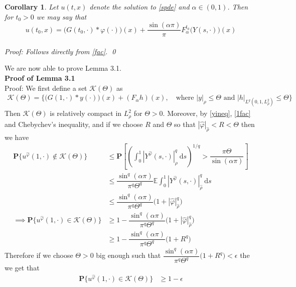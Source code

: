 \documentclass{article}
\newtheorem{corollary}{Corollary}[section]
\numberwithin{equation}{section}
\newcommand{\E}{\mathbb{E}}
\newcommand{\ud}{\ensuremath{\mathrm{d}}}
\begin{document}
\begin{corollary} Let $u(t,x)$ denote the solution to \eqref{spde} and $\alpha \in (0,1)$. Then for $t_0>0$ we may say that \begin{equation} u(t_0,x)=\big( G(t_0,\cdot)*\varphi(\cdot) \big)(x)+\dfrac{\sin(\alpha \pi)}{\pi}F_\alpha^{t_0}\big(Y(s,\cdot)\big)(x) \label{1fac}\end{equation} \\
\textit{Proof:} Follows directly from \eqref{fac}. \qed
\end{corollary}

We are now able to prove Lemma 3.1. \\

\noindent \textbf{Proof of Lemma 3.1} \\

Proof: We first define a set $\mathscr K (\Theta)$ as 
\begin{align*}
\mathscr K (\Theta) = \{ \big(G(1,\cdot)*y(\cdot)\big)(x)+(F_\alpha h)(x), \quad \text{where $|y|_{\rho} \le \Theta$  and  $|h|_{L^q(0,1,L^2_{\hat \rho})} \le \Theta $} \}
\end{align*}
Then $\mathscr K (\Theta)$ is relatively compact in $L^2_{ \rho}$ for $\Theta >0$. Moreover, by \eqref{yineq}, \eqref{1fac} and Chebychev's inequality, and if we choose $R$ and $\Theta$ so that $| \hat{\varphi}|_{\hat\rho} < R < \Theta$  then we have 
\begin{align*}
\textbf{P}\{ u^{\hat{\varphi}}(1,\cdot) \not \in \mathscr K(\Theta) \} & \le \textbf{P}\left[ \left(\int_{0}^{1} |Y^{\hat{\varphi}}(s,\cdot)|_{\rho}^q \: \ud s\right)^{1/q} > \dfrac{\pi \Theta}{\sin(\alpha \pi )} \right]
\\&\le \dfrac{\sin^q(\alpha \pi)}{\pi^q \Theta^q}\E \int_{0}^{1} |Y^{\hat{\varphi}}(s,\cdot)|_{\hat \rho}^q \: \ud s
\\& \le \dfrac{\sin^q(\alpha \pi)}{\pi^q \Theta^q}\bigg( 1+ |{\hat{\varphi}}|_{\hat\rho }^q \bigg)
\\ \implies \textbf{P}\{ u^{\hat{\varphi}}(1,\cdot) \in \mathscr K(\Theta) \} & \ge 1- \dfrac{\sin^q(\alpha \pi)}{\pi^q \Theta^q}\bigg( 1+ |{\hat{\varphi}}|_{\hat\rho }^q \bigg) 
\\ &\ge 1- \dfrac{\sin^q(\alpha \pi)}{\pi^q \Theta^q}\bigg( 1+ R^q \bigg) 
\end{align*}
Therefore if we choose $\Theta>0$ big enough such that $ \dfrac{\sin^q(\alpha \pi)}{\pi^q \Theta^q}\bigg( 1+ R^q \bigg) < \epsilon$ the we get that 
\begin{align*} 
\textbf{P}\{ u^{\hat{\varphi}}(1,\cdot) \in \mathscr K(\Theta) \} & \ge 1- \epsilon 
\end{align*} 
\end{document}
